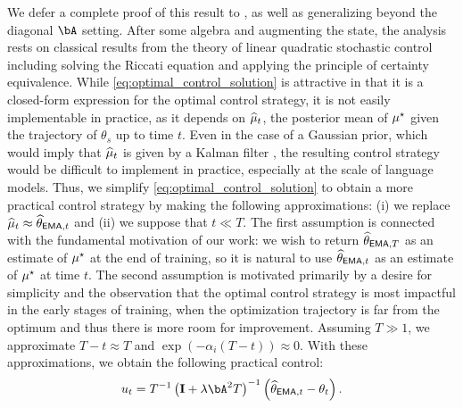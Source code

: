 We defer a complete proof of this result to , as well as generalizing beyond the diagonal $\bA$ setting.  After some algebra and augmenting the state, the analysis rests on classical results from the theory of linear quadratic stochastic control \citep{georgiou2013separation,kwakernaak1972linear} including solving the Riccati equation and applying the principle of certainty equivalence.  While \eqref{eq:optimal_control_solution} is attractive in that it is a closed-form expression for the optimal control strategy, it is not easily implementable in practice, as it depends on $\muhat_t$, the posterior mean of $\mustar$ given the trajectory of $\theta_s$ up to time $t$.  Even in the case of a Gaussian prior, which would imply that $\muhat_t$ is given by a Kalman filter \citep{kutoyants2004statistical,georgiou2013separation,yong1999stochastic}, the resulting control strategy would be difficult to implement in practice, especially at the scale of language models.  Thus, we simplify \eqref{eq:optimal_control_solution} to obtain a more practical control strategy by making the following approximations: (i) we replace $\muhat_t \approx \thetema[t]$ and (ii) we suppose that $t \ll T$.  The first assumption is connected with the fundamental motivation of our work: we wish to return $\thetema[T]$ as an estimate of $\mustar$ at the end of training, so it is natural to use $\thetema[t]$ as an estimate of $\mustar$ at time $t$.  The second assumption is motivated primarily by a desire for simplicity and the observation that the optimal control strategy is most impactful in the early stages of training, when the optimization trajectory is far from the optimum and thus there is more room for improvement.   Assuming $T \gg1$, we approximate $T -t \approx T$ and $\exp(-\alpha_i (T - t)) \approx 0$. With these approximations, we obtain the following practical control:
\begin{align}\label{eq:practical_control_strategy}
    u_t = T^{-1} \left( \eye + \lambda \bA^2 T\right)^{-1} \left( \thetema[t] - \theta_t\right).
\end{align}

